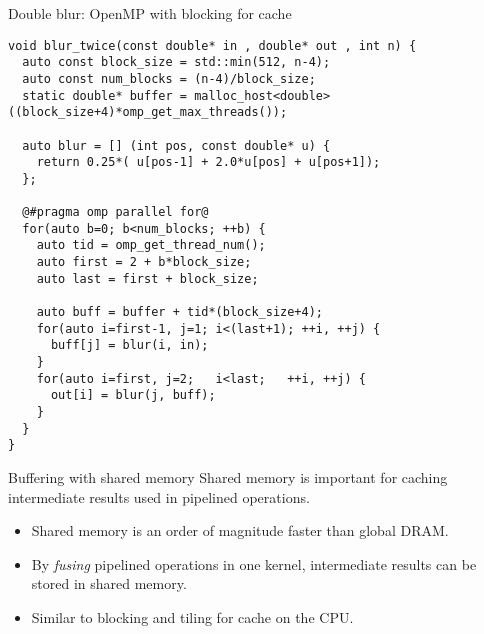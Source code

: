 \documentclass[aspectratio=43]{beamer}
\begin{document}
\begin{frame}[fragile]{}
    \begin{code}{Double blur: OpenMP with blocking for cache}
        \begin{lstlisting}[style=boxcudatiny]
void blur_twice(const double* in , double* out , int n) {
  auto const block_size = std::min(512, n-4);
  auto const num_blocks = (n-4)/block_size;
  static double* buffer = malloc_host<double>((block_size+4)*omp_get_max_threads());

  auto blur = [] (int pos, const double* u) {
    return 0.25*( u[pos-1] + 2.0*u[pos] + u[pos+1]);
  };

  @#pragma omp parallel for@
  for(auto b=0; b<num_blocks; ++b) {
    auto tid = omp_get_thread_num();
    auto first = 2 + b*block_size;
    auto last = first + block_size;

    auto buff = buffer + tid*(block_size+4);
    for(auto i=first-1, j=1; i<(last+1); ++i, ++j) {
      buff[j] = blur(i, in);
    }
    for(auto i=first, j=2;   i<last;   ++i, ++j) {
      out[i] = blur(j, buff);
    }
  }
}
        \end{lstlisting}
    \end{code}
\end{frame}

\begin{frame}[fragile]{}
    \begin{info}{Buffering with shared memory}
        Shared memory is important for caching intermediate results used in pipelined operations.
        \begin{itemize}
            \item Shared memory is an order of magnitude faster than global DRAM.
            \item By \emph{fusing} pipelined operations in one kernel, intermediate results can be stored in shared memory.
            \item Similar to blocking and tiling for cache on the CPU.
        \end{itemize}
    \end{info}

\end{frame}
\end{document}
